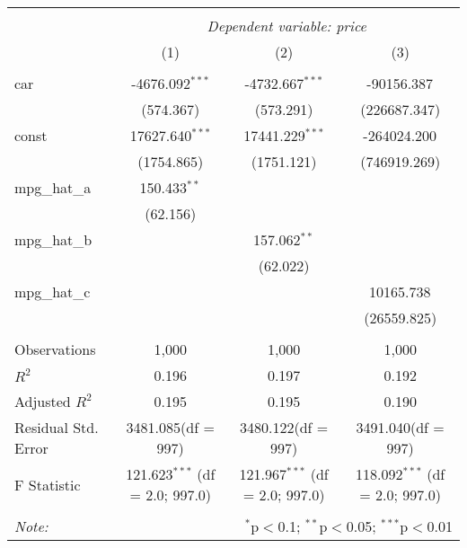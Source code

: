 \begin{table}[!htbp] \centering
\begin{tabular}{@{\extracolsep{5pt}}lccc}
\\[-1.8ex]\hline
\hline \\[-1.8ex]
& \multicolumn{3}{c}{\textit{Dependent variable: price}} \
\cr \cline{3-4}
\\[-1.8ex] & (1) & (2) & (3) \\
\hline \\[-1.8ex]
 car & -4676.092$^{***}$ & -4732.667$^{***}$ & -90156.387$^{}$ \\
  & (574.367) & (573.291) & (226687.347) \\
 const & 17627.640$^{***}$ & 17441.229$^{***}$ & -264024.200$^{}$ \\
  & (1754.865) & (1751.121) & (746919.269) \\
 mpg_hat_a & 150.433$^{**}$ & & \\
  & (62.156) & & \\
 mpg_hat_b & & 157.062$^{**}$ & \\
  & & (62.022) & \\
 mpg_hat_c & & & 10165.738$^{}$ \\
  & & & (26559.825) \\
\hline \\[-1.8ex]
 Observations & 1,000 & 1,000 & 1,000 \\
 $R^2$ & 0.196 & 0.197 & 0.192 \\
 Adjusted $R^2$ & 0.195 & 0.195 & 0.190 \\
 Residual Std. Error & 3481.085(df = 997) & 3480.122(df = 997) & 3491.040(df = 997)  \\
 F Statistic & 121.623$^{***}$ (df = 2.0; 997.0) & 121.967$^{***}$ (df = 2.0; 997.0) & 118.092$^{***}$ (df = 2.0; 997.0) \\
\hline
\hline \\[-1.8ex]
\textit{Note:} & \multicolumn{3}{r}{$^{*}$p$<$0.1; $^{**}$p$<$0.05; $^{***}$p$<$0.01} \\
\end{tabular}
\end{table}